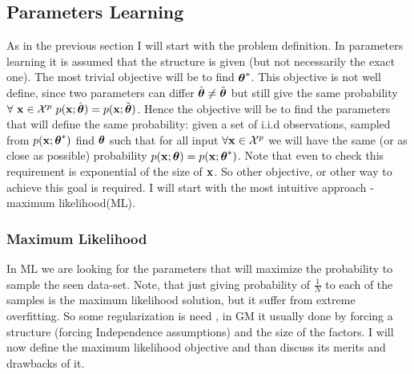 \subsection{Parameters Learning}
As in the previous section I will start with the problem definition. 
In parameters learning it is assumed that the structure is given (but not necessarily the exact one). The most trivial objective will be to find ${\boldsymbol{\theta}}^{*}$.  
This  objective is not well define,  since two parameters can differ $\hat{\boldsymbol{\theta}} \neq \tilde{\boldsymbol{\theta}}$ but still give the same probability $\forall\ {\bf x} \in {\cal X}^p\ p({\bf x};\hat{\boldsymbol{\theta}}) = p({\bf x};\tilde{\boldsymbol{\theta}})$.
Hence the objective will be to find the parameters that will define the same probability: given a set of i.i.d observations, sampled from $p({\bf x};{\boldsymbol{\theta}}^{*})$ find $\boldsymbol{\theta}$ such that for all input $\forall {\bf x} \in {\cal X}^{p}$ we will have the same (or as close as possible) probability $p({\bf x};\boldsymbol{\theta}) = p({\bf x};{\boldsymbol{\theta}}^{*})$.
Note that even to check this requirement is exponential of the size of ${\bf x}$.
So other objective, or other way to achieve this goal is required.
I will start with the  most intuitive approach - maximum likelihood(ML).

\subsubsection{Maximum Likelihood}
\label{sec:max_likelihood}
In ML we are looking for the parameters that will maximize the probability to sample the seen data-set.
Note, that just giving probability of $\frac{1}{N}$ to each of the samples is the maximum likelihood solution, but it suffer from extreme overfitting.
So some regularization is need , in GM it usually done by forcing a structure (forcing Independence assumptions) and the size of the factors.
I will now define the maximum likelihood objective and than discuss its merits and drawbacks of it.

